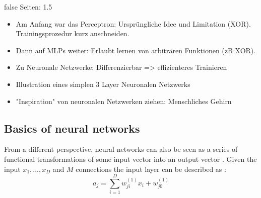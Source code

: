 \documentclass[draft,final,oneside]{vutinfth} %
\begin{document}
\if false
Seiten: 1.5

\begin{itemize}

\item Am Anfang war das Perceptron: Ursprüngliche Idee und Limitation (XOR). Trainingsprozedur kurz anschneiden.
\item Dann auf MLPs weiter: Erlaubt lernen von arbiträren Funktionen (zB XOR).
\item Zu Neuronale Netzwerke: Differenzierbar => effizienteres Trainieren
\item Illustration eines simplen 3 Layer Neuronalen Netzwerks
\item "Inspiration" von neuronalen Netzwerken ziehen: Menschliches Gehirn

\end{itemize}

\fi

\subsection{Basics of neural networks}

From a different perspective, neural networks can also be seen as a series of functional transformations of some input vector into an output vector \cite{colahbackprop}. Given the input $x_1, ..., x_D$ and $M$ connections the input layer can be described as \cite{bishop}:
\begin{equation}
a_j = \sum_{i=1}^{D} w_{ji}^{(1)}x_i + w_{j0}^{(1)}
\end{equation}
\end{document}
